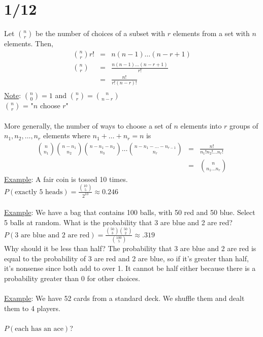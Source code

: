 \section*{1/12}
  Let ${\binom{n}{r}}$ be the number of choices of a subset with $r$ elements
  from a set with $n$ elements. Then, 
  \begin{eqnarray*}
  \binom{n}{r} r! &=& n(n-1)\ldots (n-r+1)\\
  \binom{n}{r} &=& \frac{n(n-1)\ldots (n-r+1)}{r!}\\
  &=& \frac{n!}{r!(n-r)!}\\
  \end{eqnarray*}
  \underline{Note}: $\binom{n}{0} = 1$ and $\binom{n}{r} = \binom{n}{n-r}$\\
  $\binom{n}{r}$ = "$n$ choose $r$"\\\\
  More generally, the number of ways to choose a set of $n$ elements into $r$
  groups of $n_1, n_2, \ldots, n_r$ elements where $n_1 + \ldots + n_r = n$ is 
  \begin{eqnarray*}
    \binom{n}{n_1}\binom{n - n_1}{n_2}\binom{n-n_1-n_2}{n_3} \ldots 
    \binom{n-n_1-\ldots - n_{r-1}}{n_r} & = & \frac{n!}{n_1!n_2!\ldots n_r!}\\
    & = & \binom{n}{n_1\ldots n_r}
  \end{eqnarray*}
  \underline{Example}: A fair coin is tossed 10 times.\\
  $P(\text{exactly 5 heads}) = \frac{\binom{10}{5}}{2^{10}} \approx 0.246$\\\\
  \underline{Example}: We have a bag that contains 100 balls, with 50 red and 50
  blue. Select 5 balls at random. What is the probability that 3 are blue and
  2 are red?\\
  $P(\text{3 are blue and 2 are red}) = \frac{\binom{50}{3}\binom{50}{2}}
  {\binom{100}{5}} \approx .319 $\\
  Why should it be less than half? The probability that 3 are blue and 2 are red
  is equal to the probability of 3 are red and 2 are blue, so if it's greater than
  half, it's nonsense since both add to over 1. It cannot be half either because
  there is a probability greater than 0 for other choices.\\\\
  \underline{Example}: We have 52 cards from a standard deck. We shuffle them
  and dealt them to 4 players.\\\\
  $P(\text{each has an ace}) $?\\
